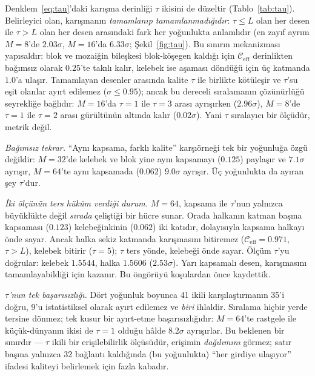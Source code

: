 \documentclass[10pt,journal]{IEEEtran}
\begin{document}
Denklem~\eqref{eq:tau}'daki karışma derinliği $\tau$ ikisini de düzeltir
(Tablo~\ref{tab:tau}). Belirleyici olan, karışmanın \emph{tamamlanıp tamamlanmadığıdır}:
$\tau \le L$ olan her desen ile $\tau > L$ olan her desen arasındaki fark her yoğunlukta
anlamlıdır (en zayıf ayrım $M{=}8$'de $2.03\sigma$, $M{=}16$'da $6.33\sigma$;
Şekil~\ref{fig:tau}). Bu sınırın
mekanizması yapısaldır: blok ve mozaiğin bileşkesi blok-köşegen kaldığı için
$\mathcal{C}_{\mathrm{eff}}$ derinlikten bağımsız olarak $0.25$'te takılı kalır, kelebek ise
aşaması döndüğü için üç katmanda $1.0$'a ulaşır. Tamamlayan desenler arasında kalite $\tau$
ile birlikte kötüleşir ve $\tau$'su eşit olanlar ayırt edilemez ($\sigma \le 0.95$); ancak
bu dereceli sıralamanın çözünürlüğü seyrekliğe bağlıdır: $M{=}16$'da $\tau{=}1$ ile
$\tau{=}3$ arası ayrışırken ($2.96\sigma$), $M{=}8$'de $\tau{=}1$ ile $\tau{=}2$ arası
gürültünün altında kalır ($0.02\sigma$). Yani $\tau$ sıralayıcı bir ölçüdür, metrik değil.

\emph{Bağımsız tekrar.} ``Aynı kapsama, farklı kalite'' karşıörneği tek bir yoğunluğa özgü
değildir: $M{=}32$'de kelebek ve blok yine aynı kapsamayı ($0.125$) paylaşır ve $7.1\sigma$
ayrışır, $M{=}64$'te aynı kapsamada ($0.062$) $9.0\sigma$ ayrışır. Üç yoğunlukta da ayıran
şey $\tau$'dur.

\emph{İki ölçünün ters hüküm verdiği durum.} $M{=}64$, kapsama ile $\tau$'nun yalnızca
büyüklükte değil \emph{sırada} çeliştiği bir hücre sunar. Orada halkanın katman başına
kapsaması ($0.123$) kelebeğinkinin ($0.062$) iki katıdır, dolayısıyla kapsama halkayı önde
sayar. Ancak halka sekiz katmanda karışmasını bitiremez
($\mathcal{C}_{\mathrm{eff}}{=}0.971$, $\tau>L$), kelebek bitirir ($\tau{=}5$); $\tau$ ters
yönde, kelebeği önde sayar. Ölçüm $\tau$'yu doğrular: kelebek $1.5544$, halka $1.5606$
($2.53\sigma$). Yarı kapsamalı desen, karışmasını tamamlayabildiği için kazanır. Bu öngörüyü
koşulardan önce kaydettik.

\emph{$\tau$'nun tek başarısızlığı.} Dört yoğunluk boyunca 41 ikili karşılaştırmanın
35'i doğru, 9'u istatistiksel olarak ayırt edilemez ve \emph{biri} ihlaldir. Sıralama hiçbir
yerde tersine dönmez; tek kusur bir ayırt-etme başarısızlığıdır: $M{=}64$'te rastgele ile
küçük-dünyanın ikisi de $\tau{=}1$ olduğu hâlde $8.2\sigma$ ayrışırlar. Bu beklenen bir
sınırdır --- $\tau$ ikili bir erişilebilirlik ölçüsüdür, erişimin \emph{dağılımını} görmez;
satır başına yalnızca 32 bağlantı kaldığında (bu yoğunlukta) ``her girdiye ulaşıyor'' ifadesi
kaliteyi belirlemek için fazla kabadır.
\end{document}

